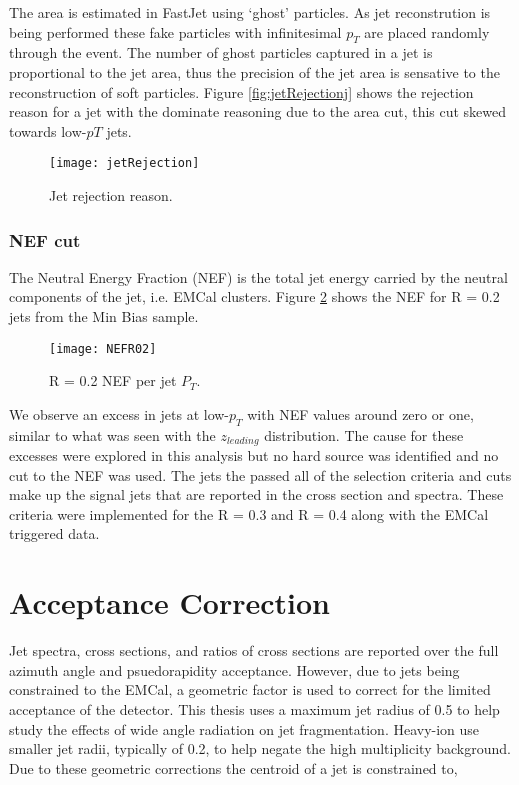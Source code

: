 The area is estimated in FastJet using `ghost' particles.  As jet reconstrution is being performed these fake particles with infinitesimal $p_{T}$ are placed randomly through the event.  The number of ghost particles captured in a jet is proportional to the jet area, thus the precision of the jet area is sensative to the reconstruction of soft particles.  Figure \ref{fig:jetRejectionj} shows the rejection reason for a jet with the dominate reasoning due to the area cut, this cut skewed towards low-$p{T}$ jets.

\begin{figure}[h]
\texttt{[image: jetRejection]}
\centering
\caption{Jet rejection reason.}
\label{fig:jetRejection}
\end{figure}

\subsubsection{NEF cut}
The Neutral Energy Fraction (NEF) is the total jet energy carried by the neutral components of the jet, i.e. EMCal clusters.  Figure \ref{fig:JetNEF} shows the NEF for R = 0.2 jets from the Min Bias sample.

\begin{figure}[h]
\texttt{[image: NEFR02]}
\centering
\caption{R = 0.2 NEF per jet $P_{T}$.}
\label{fig:JetNEF}
\end{figure}
\noindent
We observe an excess in jets at low-$p_{T}$ with NEF values around zero or one, similar to what was seen with the $z_{leading}$ distribution.  The cause for these excesses were explored in this analysis but no hard source was identified and no cut to the NEF was used.
The jets the passed all of the selection criteria and cuts make up the signal jets that are reported in the cross section and spectra.  These criteria were implemented for the R = 0.3 and R = 0.4 along with the EMCal triggered data.




\section{Acceptance Correction}
Jet spectra, cross sections, and ratios of cross sections are reported over the full azimuth angle and psuedorapidity acceptance.  However, due to jets being constrained to the EMCal, a geometric factor is used to correct for the limited acceptance of the detector.  This thesis uses a maximum jet radius of 0.5 to help study the effects of wide angle radiation on jet fragmentation.  Heavy-ion use smaller jet radii, typically of 0.2, to help negate the high multiplicity background.  Due to these geometric corrections the centroid of a jet is constrained to,

